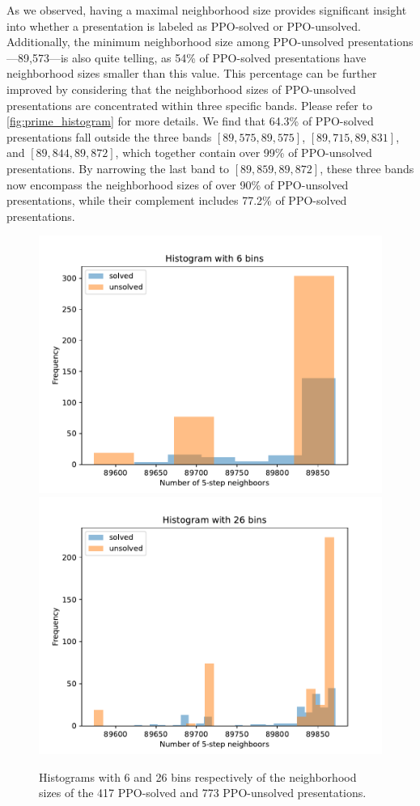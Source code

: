 As we observed, having a maximal neighborhood size provides significant insight into whether a presentation is labeled as PPO-solved or PPO-unsolved.
Additionally, the minimum neighborhood size among PPO-unsolved presentations—89,573—is also quite telling, as 54\% of PPO-solved presentations have neighborhood sizes smaller than this value.
This percentage can be further improved by considering that the neighborhood sizes of PPO-unsolved presentations are concentrated within three specific bands.
Please refer to \autoref{fig:prime_histogram} for more details.
We find that 64.3\% of PPO-solved presentations fall outside the three bands \([89,575, 89,575]\), \([89,715, 89,831]\), and \([89,844, 89,872]\), which together contain over 99\% of PPO-unsolved presentations.
By narrowing the last band to \([89,859, 89,872]\), these three bands now encompass the neighborhood sizes of over 90\% of PPO-unsolved presentations, while their complement includes 77.2\% of PPO-solved presentations.


\begin{figure}
	\centering
	\includegraphics[scale=.34]{fig/prime_histogram_rl.pdf}
	\includegraphics[scale=.34]{fig/prime_histogram_rl2.pdf}
	\caption{Histograms with 6 and 26 bins respectively of the neighborhood sizes of the 417 PPO-solved and 773 PPO-unsolved presentations.}
	\label{fig:prime_histogram}
\end{figure}


